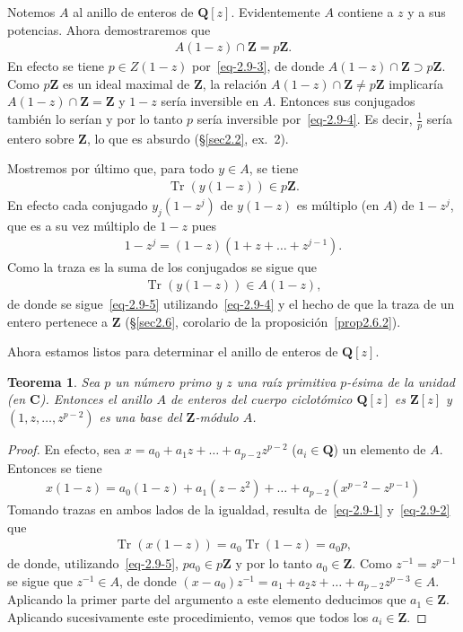 \documentclass[oneside,bibtotoc,leqno,spanish]{amsbook}
\newcommand{\QQ}{\mathbf{Q}}
\newcommand{\ZZ}{\mathbf{Z}}
\newcommand{\CC}{\mathbf{C}}
\newcommand{\QED}{}%
\DeclareMathOperator{\Tr}{Tr}
\numberwithin{equation}{section}
\theoremstyle{defi}
\theoremstyle{note}
\newtheorem{theorem}{Teorema}
\theoremstyle{rem}
\numberwithin{theorem}{section}
\numberwithin{proposition}{section}
\numberwithin{definition}{section}
\numberwithin{lemma}{section}
\numberwithin{corollary}{section}
\numberwithin{example}{section}
\numberwithin{footnote}{section}%
\begin{document}
Notemos $A$ al anillo de enteros de $\QQ[z]$. Evidentemente $A$ contiene a $z$ y a sus potencias. Ahora
demostraremos que
\begin{gather}\label{eq-2.9-4}
A(1-z)\cap\ZZ = p\ZZ.
\end{gather}
En efecto se tiene $p\in Z(1-z)$ por~\eqref{eq-2.9-3}, de donde $A(1-z)\cap\ZZ\supset p\ZZ$. Como $p\ZZ$
es un ideal maximal de $\ZZ$, la relaci\'on $A(1-z)\cap\ZZ\neq p\ZZ$ implicar\'ia $A(1-z)\cap\ZZ=\ZZ$ y
$1-z$ ser\'ia inversible en $A$. Entonces sus conjugados tambi\'en lo ser\'ian y por lo tanto $p$ ser\'ia
inversible por~\eqref{eq-2.9-4}. Es decir, $\frac{1}{p}$ ser\'ia entero sobre $\ZZ$, lo que es absurdo
(\S\ref{sec2.2}, ex.~2).

Mostremos por \'ultimo que, para todo $y\in A$, se tiene
\begin{gather}\label{eq-2.9-5}
\Tr(y(1-z))\in p\ZZ.
\end{gather}
En efecto cada conjugado $y_{j}(1-z^{j})$ de $y(1-z)$ es m\'ultiplo (en $A$) de $1-z^{j}$, que es a su
vez m\'ultiplo de $1-z$ pues
\begin{gather*}
1-z^{j} = (1-z)(1+z+\dots+z^{j-1}).
\end{gather*}
Como la traza es la suma de los conjugados se sigue que
\begin{gather*}
\Tr(y(1-z))\in A(1-z),
\end{gather*}
de donde se sigue~\eqref{eq-2.9-5} utilizando~\eqref{eq-2.9-4} y el hecho de que la traza de un entero
pertenece a $\ZZ$ (\S\ref{sec2.6}, corolario de la proposici\'on~\ref{prop2.6.2}).

Ahora estamos listos para determinar el anillo de enteros de $\QQ[z]$.

\begin{theorem}\label{teo2.9.2}
Sea $p$ un n\'umero primo y $z$ una ra\'iz primitiva $p$-\'esima de la unidad (en $\CC$). Entonces el
anillo $A$ de enteros del cuerpo ciclot\'omico $\QQ[z]$ es $\ZZ[z]$ y $(1,z,\dots,z^{p-2})$ es una base
del $\ZZ$-m\'odulo $A$.
\end{theorem}

\begin{proof}
En efecto, sea $x = a_{0}+a_{1}z+\dots+a_{p-2}z^{p-2}$ ($a_{i}\in\QQ$) un elemento de $A$. Entonces
se tiene
\begin{gather*}
x(1-z) = a_{0}(1-z)+a_{1}(z-z^{2})+\dots+a_{p-2}(x^{p-2}-z^{p-1})
\end{gather*}
Tomando trazas en ambos lados de la igualdad, resulta de~\eqref{eq-2.9-1} y~\eqref{eq-2.9-2} que
\begin{gather*}
\Tr(x(1-z)) = a_{0}\Tr(1-z)=a_{0}p,
\end{gather*}
de donde, utilizando~\eqref{eq-2.9-5}, $pa_{0}\in p\ZZ$ y por lo tanto $a_{0}\in\ZZ$. Como
$z^{-1}=z^{p-1}$ se sigue que $z^{-1}\in A$, de donde $(x-a_{0})z^{-1}=a_{1}+a_{2}z+\dots+a_{p-2}z^{p-3}\in A$.
Aplicando la primer parte del argumento a este elemento deducimos que $a_{1}\in\ZZ$. Aplicando sucesivamente
este procedimiento, vemos que todos los $a_{i}\in\ZZ$. \QED
\end{proof}
\end{document}
